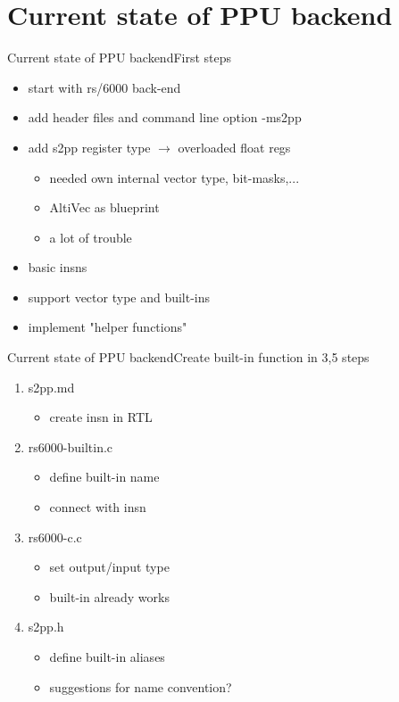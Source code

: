 \documentclass[10pt]{beamer}
\begin{document}
\section{Current state of PPU backend}
\begin{frame}{Current state of PPU backend}{First steps}
	\begin{itemize}
		\item start with rs/6000 back-end
		\item add header files and command line option -ms2pp
		\item add s2pp register type $\rightarrow$ overloaded float regs
			\begin{itemize}
				\item needed own internal vector type, bit-masks,...
				\item AltiVec as blueprint
				\item a lot of trouble
			\end{itemize}
		\item basic insns
		\item support vector type and built-ins
		\item implement "helper functions"
	\end{itemize}
\end{frame}

\begin{frame}{Current state of PPU backend}{Create built-in function in 3,5 steps}
	\begin{enumerate}
		\item s2pp.md
		\begin{itemize}
			\item create insn in RTL
		\end{itemize}
		\item rs6000-builtin.c
		\begin{itemize}
			\item define built-in name
			\item connect with insn
		\end{itemize}
		\item rs6000-c.c
		\begin{itemize}
			\item set output/input type
			\item built-in already works
		\end{itemize}
		\item s2pp.h
		\begin{itemize}
			\item define built-in aliases
			\item suggestions for name convention?
		\end{itemize}
	\end{enumerate}
\end{frame}
\end{document}
